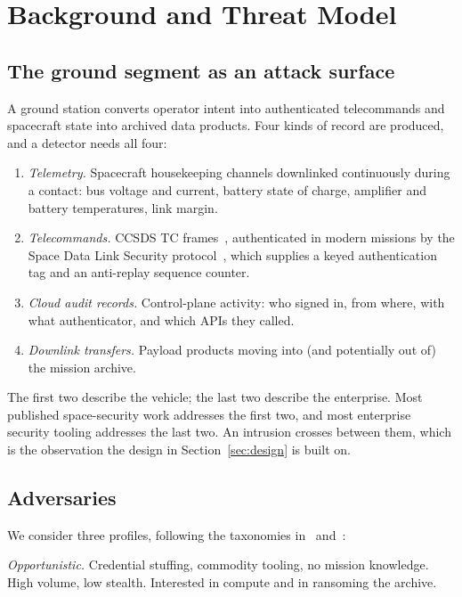 \documentclass[conference]{IEEEtran}
\begin{document}
\section{Background and Threat Model}
\label{sec:background}

\subsection{The ground segment as an attack surface}

A ground station converts operator intent into authenticated telecommands and
spacecraft state into archived data products. Four kinds of record are produced,
and a detector needs all four:

\begin{enumerate}
  \item \emph{Telemetry.} Spacecraft housekeeping channels downlinked
  continuously during a contact: bus voltage and current, battery state of
  charge, amplifier and battery temperatures, link margin.
  \item \emph{Telecommands.} CCSDS TC frames~\cite{ccsds232}, authenticated in
  modern missions by the Space Data Link Security protocol~\cite{ccsds355},
  which supplies a keyed authentication tag and an anti-replay sequence counter.
  \item \emph{Cloud audit records.} Control-plane activity: who signed in, from
  where, with what authenticator, and which APIs they called.
  \item \emph{Downlink transfers.} Payload products moving into (and
  potentially out of) the mission archive.
\end{enumerate}

The first two describe the vehicle; the last two describe the enterprise. Most
published space-security work addresses the first two, and most enterprise
security tooling addresses the last two. An intrusion crosses between them,
which is the observation the design in Section~\ref{sec:design} is built on.

\subsection{Adversaries}

We consider three profiles, following the taxonomies in~\cite{manulis2021newspace}
and~\cite{falco2019principles}:

\emph{Opportunistic.} Credential stuffing, commodity tooling, no mission
knowledge. High volume, low stealth. Interested in compute and in ransoming the
archive.
\end{document}
